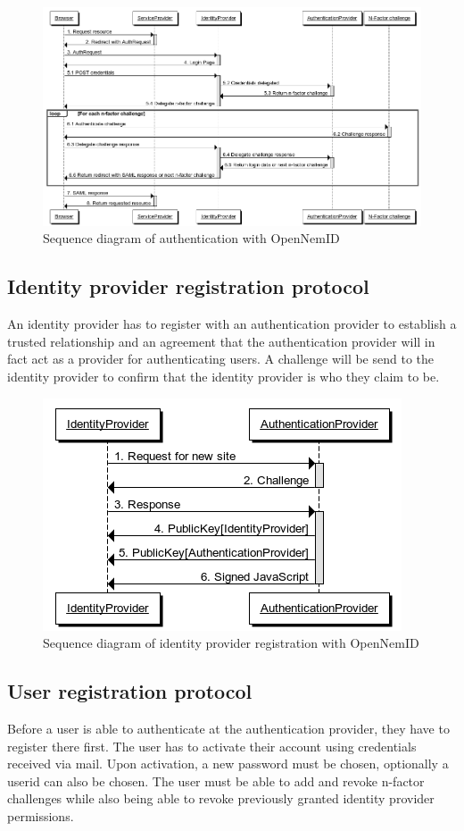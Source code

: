 \documentclass[twosided]{report}
\begin{document}
\begin{figure}[H]
	\centering
	\includegraphics[scale=0.4]{images/Open-NemId-(User-Login).png}
	\caption{Sequence diagram of authentication with OpenNemID}
\end{figure}

\subsection{Identity provider registration protocol}
An identity provider has to register with an authentication provider to establish a trusted relationship and an agreement that the authentication provider will in fact act as a provider for authenticating users. A challenge will be send to the identity provider to confirm that the identity provider is who they claim to be.

\begin{figure}[H]
	\centering
	\includegraphics[scale=0.6]{images/Open-NemId-(IdentityProvider-Registration).png}
	\caption{Sequence diagram of identity provider registration with OpenNemID}
\end{figure}

\subsection{User registration protocol}
Before a user is able to authenticate at the authentication provider, they have to register there first. The user has to activate their account using credentials received via mail. Upon activation, a new password must be chosen, optionally a userid can also be chosen. The user must be able to add and revoke n-factor challenges while also being able to revoke previously granted identity provider permissions.
\end{document}
